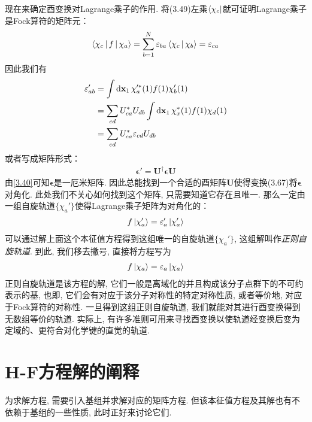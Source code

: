 现在来确定酉变换对Lagrange乘子的作用. 
将(3.49)左乘$\Bra{\chi_c}$就可证明Lagrange乘子是Fock算符的矩阵元：
\begin{align}
	\Braket{\chi_c|f|\chi_a} = \sum_{b=1}^{N}\varepsilon_{ba}\Braket{\chi_c|\chi_b} = \varepsilon_{ca}
\end{align}
因此我们有
\begin{align}
	\epsilon_{ab}' & = \int\dd{x}_1\,\chi_a^{\prime *}(1)f(1)\chi_b'(1)\notag\\
	& = \sum_{cd}U_{ca}^* U_{db}\int\dd{x}_1\,\chi_x^*(1)f(1)\chi_d(1)\notag\\
	& = \sum_{cd}U_{ca}^* \epsilon_{cd} U_{db}
\end{align}
或者写成矩阵形式：
\begin{align}
	\bm{\epsilon}' = \mathbf{U}^\dagger \bm{\epsilon}\mathbf{U}
\end{align}
由\autoref{3.40}可知$\bm{\epsilon}$是一厄米矩阵. 
因此总能找到一个合适的酉矩阵$\mathbf{U}$使得变换(3.67)将$\bm{\epsilon}$对角化. 
此处我们不关心如何找到这个矩阵, 
只需要知道它存在且唯一. 
那么一定由一组自旋轨道$\{\chi_a'\}$使得Lagrange乘子矩阵为对角化的：
\begin{align}
	f\Ket{\chi_a'} = \varepsilon_a'\Ket{\chi_a'}
\end{align}
可以通过解上面这个本征值方程得到这组唯一的自旋轨道$\{\chi_a'\}$, 
这组解叫作\emph{正则自旋轨道}. 
到此, 
我们移去撇号, 
直接将\hft 方程写为
\begin{align}
	f\Ket{\chi_a} = \varepsilon_a\Ket{\chi_a}
\end{align}
正则自旋轨道是该方程的解, 
它们一般是离域化的并且构成该分子点群下的不可约表示的基, 
也即, 
它们会有对应于该分子对称性的特定对称性质, 
或者等价地, 
对应于Fock算符的对称性. 
一旦得到这组正则自旋轨道, 
我们就能对其进行酉变换得到无数组等价的轨道. 
实际上, 
有许多准则可用来寻找酉变换以使轨道经变换后变为定域的、更符合对化学键的直觉的轨道.

\section{H-F方程解的阐释}
为求解\hft 方程, 
需要引入基组并求解对应的矩阵方程. 
但该本征值方程及其解也有不依赖于基组的一些性质, 
此时正好来讨论它们.

